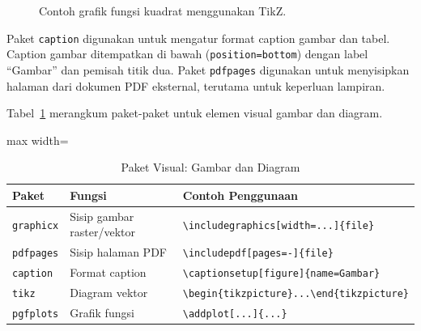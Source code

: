 \begin{figure}[h]
  \centering
  \caption{Contoh grafik fungsi kuadrat menggunakan TikZ.}
  \label{fig:contoh-grafik}
\end{figure}

Paket \texttt{caption} digunakan untuk mengatur format caption gambar dan tabel. Caption gambar ditempatkan di bawah (\texttt{position=bottom}) dengan label ``Gambar'' dan pemisah titik dua. Paket \texttt{pdfpages} digunakan untuk menyisipkan halaman dari dokumen PDF eksternal, terutama untuk keperluan lampiran.

Tabel~\ref{tab:paket-visual-gambar} merangkum paket-paket untuk elemen visual gambar dan diagram.

\begin{table}[h]
  \centering
  \caption{Paket Visual: Gambar dan Diagram}
  \label{tab:paket-visual-gambar}
  \begin{adjustbox}{max width=\textwidth}
  \begin{tabular}{lll}
    \toprule
    \textbf{Paket} & \textbf{Fungsi} & \textbf{Contoh Penggunaan} \\
    \midrule
    \texttt{graphicx} & Sisip gambar raster/vektor & \texttt{\textbackslash includegraphics[width=...]\{file\}} \\
    \texttt{pdfpages} & Sisip halaman PDF & \texttt{\textbackslash includepdf[pages=-]\{file\}} \\
    \texttt{caption} & Format caption & \texttt{\textbackslash captionsetup[figure]\{name=Gambar\}} \\
    \texttt{tikz} & Diagram vektor & \texttt{\textbackslash begin\{tikzpicture\}...\textbackslash end\{tikzpicture\}} \\
    \texttt{pgfplots} & Grafik fungsi & \texttt{\textbackslash addplot[...]\{...\}} \\
    \bottomrule
  \end{tabular}
  \end{adjustbox}
\end{table}

